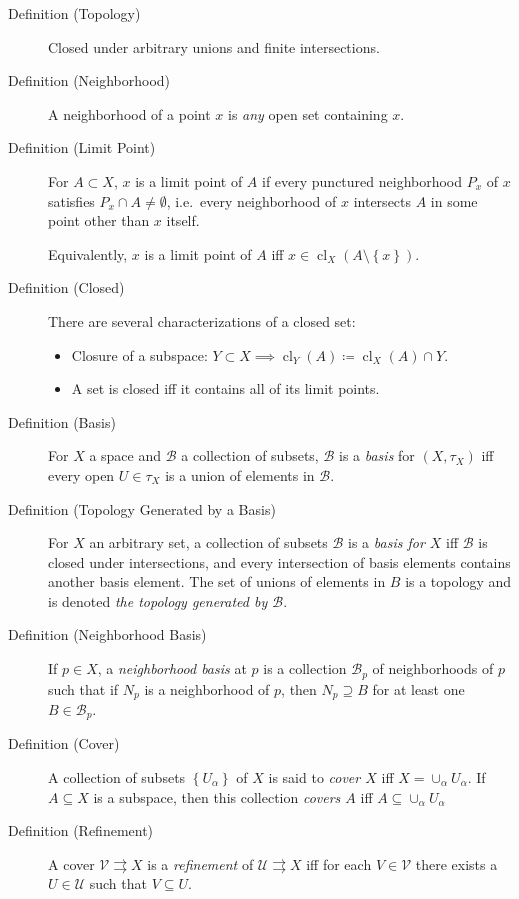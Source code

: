 \begin{description}
\item[Definition (Topology)]
Closed under arbitrary unions and finite intersections.
\item[Definition (Neighborhood)]
A neighborhood of a point \(x\) is \emph{any} open set containing \(x\).
\item[Definition (Limit Point)]
For \(A\subset X\), \(x\) is a limit point of \(A\) if every punctured
neighborhood \(P_x\) of \(x\) satisfies \(P_x \cap A \neq \emptyset\),
i.e.~every neighborhood of \(x\) intersects \(A\) in some point other
than \(x\) itself.

Equivalently, \(x\) is a limit point of \(A\) iff
\(x\in \operatorname{cl}_X(A\setminus\left\{{x}\right\})\).
\item[Definition (Closed)]
There are several characterizations of a closed set:

\begin{itemize}
\tightlist
\item
  Closure of a subspace:
  \(Y\subset X \implies \operatorname{cl}_Y(A) \coloneqq\operatorname{cl}_X(A)\cap Y\).
\item
  A set is closed iff it contains all of its limit points.
\end{itemize}
\item[Definition (Basis)]
For \(X\) a space and \({\mathcal{B}}\) a collection of subsets,
\({\mathcal{B}}\) is a \emph{basis} for \((X, \tau_X)\) iff every open
\(U\in \tau_X\) is a union of elements in \({\mathcal{B}}\).
\item[Definition (Topology Generated by a Basis)]
For \(X\) an arbitrary set, a collection of subsets \({\mathcal{B}}\) is
a \emph{basis for \(X\)} iff \({\mathcal{B}}\) is closed under
intersections, and every intersection of basis elements contains another
basis element. The set of unions of elements in \(B\) is a topology and
is denoted \emph{the topology generated by \({\mathcal{B}}\)}.
\item[Definition (Neighborhood Basis)]
If \(p\in X\), a \emph{neighborhood basis} at \(p\) is a collection
\({\mathcal{B}}_p\) of neighborhoods of \(p\) such that if \(N_p\) is a
neighborhood of \(p\), then \(N_p \supseteq B\) for at least one
\(B\in {\mathcal{B}}_p\).
\item[Definition (Cover)]
A collection of subsets \(\left\{{U_\alpha}\right\}\) of \(X\) is said
to \emph{cover \(X\)} iff \(X = \cup_{\alpha} U_\alpha\). If
\(A\subseteq X\) is a subspace, then this collection \emph{covers \(A\)}
iff \(A\subseteq \cup_{\alpha} U_\alpha\)
\item[Definition (Refinement)]
A cover \({\mathcal{V}}\rightrightarrows X\) is a \emph{refinement} of
\({\mathcal{U}}\rightrightarrows X\) iff for each \(V\in {\mathcal{V}}\)
there exists a \(U\in{\mathcal{U}}\) such that \(V\subseteq U\).
\end{description}

